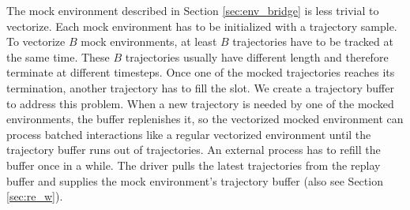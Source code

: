The mock environment described in Section \ref{sec:env_bridge} is less trivial to vectorize.
Each mock environment has to be initialized with a trajectory sample.
To vectorize $B$ mock environments, at least $B$ trajectories have to be tracked at the same time.
These $B$ trajectories usually have different length and therefore terminate at different timesteps.
Once one of the mocked trajectories reaches its termination, another trajectory has to fill the slot.
We create a trajectory buffer to address this problem.
When a new trajectory is needed by one of the mocked environments, the buffer replenishes it,
so the vectorized mocked environment can process batched interactions like a regular vectorized environment until the trajectory buffer runs out of trajectories.
An external process has to refill the buffer once in a while.
The driver pulls the latest trajectories from the replay buffer and supplies the mock environment's trajectory buffer (also see Section \ref{sec:re_w}).

